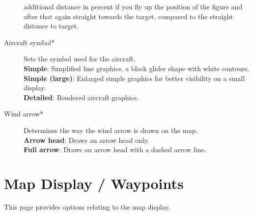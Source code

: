 \begin{description}
  additional distance in percent if you fly up the position of the figure and
  after that again straight towards the target, compared to the straight distance
  to target.
\item[Aircraft symbol*]  Sets the symbol used for the aircraft. \\
  {\bf Simple}: Simplified line graphics, a black glider shape with white contours. \\
  {\bf Simple (large)}: Enlarged simple graphics for better visibility on a small display. \\
  {\bf Detailed}: Rendered aircraft graphics.
\item[Wind arrow*]  Determines the way the wind arrow is drawn on the map. \\
  {\bf Arrow head}: Draws an arrow head only. \\
  {\bf Full arrow}: Draws an arrow head with a dashed arrow line.
\end{description}


\section{Map Display / Waypoints}\label{sec:waypoint-display}

This page provides options relating to the map display.

